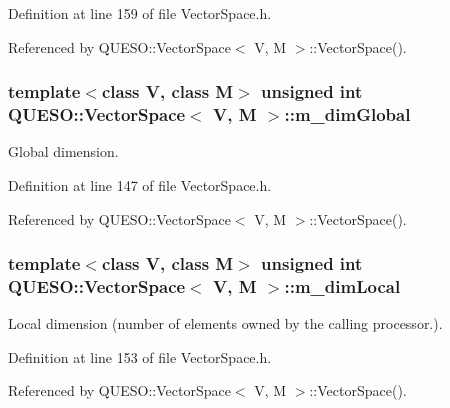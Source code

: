 Definition at line 159 of file Vector\-Space.\-h.



Referenced by Q\-U\-E\-S\-O\-::\-Vector\-Space$<$ V, M $>$\-::\-Vector\-Space().

\hypertarget{class_q_u_e_s_o_1_1_vector_space_ad3efef4a407fdc5c98fded11f2f2444e}{
\subsubsection[{m\-\_\-dim\-Global}]{\setlength{\rightskip}{0pt plus 5cm}template$<$class V, class M$>$ unsigned int {\bf Q\-U\-E\-S\-O\-::\-Vector\-Space}$<$ V, M $>$\-::m\-\_\-dim\-Global\hspace{0.3cm}{\ttfamily [protected]}}}\label{class_q_u_e_s_o_1_1_vector_space_ad3efef4a407fdc5c98fded11f2f2444e}


Global dimension. 



Definition at line 147 of file Vector\-Space.\-h.



Referenced by Q\-U\-E\-S\-O\-::\-Vector\-Space$<$ V, M $>$\-::\-Vector\-Space().

\hypertarget{class_q_u_e_s_o_1_1_vector_space_aa6db91aca8a1f79e27d2f472528850bb}{
\subsubsection[{m\-\_\-dim\-Local}]{\setlength{\rightskip}{0pt plus 5cm}template$<$class V, class M$>$ unsigned int {\bf Q\-U\-E\-S\-O\-::\-Vector\-Space}$<$ V, M $>$\-::m\-\_\-dim\-Local\hspace{0.3cm}{\ttfamily [protected]}}}\label{class_q_u_e_s_o_1_1_vector_space_aa6db91aca8a1f79e27d2f472528850bb}


Local dimension (number of elements owned by the calling processor.). 



Definition at line 153 of file Vector\-Space.\-h.



Referenced by Q\-U\-E\-S\-O\-::\-Vector\-Space$<$ V, M $>$\-::\-Vector\-Space().

